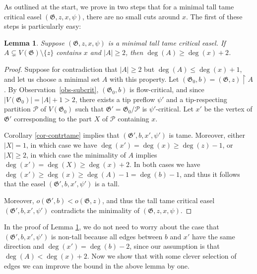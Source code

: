 \documentclass{article}
\newcommand{\PP}{\mathcal{P}}
\newcommand\g{\mathfrak{G}}
\newtheorem{lemma}[theorem]{Lemma}
\begin{document}
As outlined at the start, we prove in two steps that for a minimal tall tame critical easel $(\g, z, x, \psi)$, there are no small cuts around $x$. The first of these steps is particularly easy:
\begin{lemma}\label{lemma-sepxsmall}
Suppose $(\g,z,x,\psi)$ is a minimal tall tame critical easel.  If $A\subsetneq V(\g)\setminus\{z\}$ contains $x$
and $|A|\ge 2$, then $\deg(A) \ge \deg(x)+2$.
\end{lemma}
\begin{proof}
Suppose for contradiction that $|A|\ge 2$ but $\deg(A)\le \deg(x)+1$, and let us choose a minimal set $A$ with this property.
Let $(\g_0,b)=(\g,z)\restriction A$. By Observation~\ref{obs-subcrit}, $(\g_0, b)$ is flow-critical, and since $|V(\g_0)|=|A|+1>2$,
there exists a tip preflow $\psi'$ and a tip-respecting partition $\PP$ of $V(\g_0)$ such that $\g'=\g_0/\PP$ is $\psi'$-critical. Let $x'$ be the vertex of $\g'$ corresponding to the part $X$ of $\PP$ containing $x$. 

Corollary \ref{cor-contrtame} implies that $(\g',b,x',\psi')$ is tame. 
Moreover, either $|X| =1$, in which case we have
$\deg(x') = \deg(x) \geq \deg(z) -1$, or $|X| \geq 2$, in which case the
minimality of $A$ implies $\deg(x') = \deg(X) \geq \deg(x)+2$.
In both cases we have $\deg(x') \geq \deg(x) \geq \deg(A)-1 = \deg(b)-1$, and
thus it follows that the easel $(\g',b,x',\psi')$ is a tall.

Moreover, $o(\g',b) < o(\g,z)$, and thus the tall tame critical easel $(\g',b,x',\psi')$ contradicts the minimality of $(\g,z,x,\psi)$.
\end{proof}



In the proof of Lemma \ref{lemma-sepxsmall}, we do not need to worry about the case that $(\g',b,x',\psi')$ is non-tall
because all edges between $b$ and $x'$ have the same direction and $\deg(x')=\deg(b)-2$,
since our assumption is that $\deg(A)<\deg(x)+2$. Now we show that with some clever selection of edges we can improve the bound in the above lemma by one.
\end{document}
